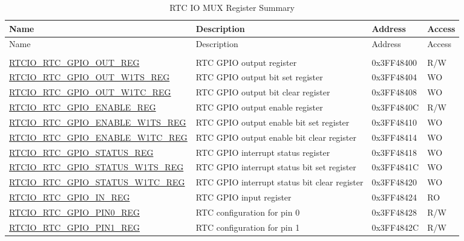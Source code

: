\begin{longtable}{ | p{6.2cm} | p{6.8cm} | p{1.9cm} | p{1.1cm} | }
\caption{RTC IO MUX Register Summary}
\\\hline\rowcolor{lightgray}
Name & Description &  Address & Access \\ \hline
\endfirsthead
\hline\rowcolor{lightgray}
Name & Description &  Address & Access \\ \hline
\endhead
\endfoot
\multicolumn{4}{|l|}{\textbf{GPIO configuration / data registers}} \\ \hline
\hyperref[regdesc:RTCIORTCGPIOOUTREG]{RTCIO\_RTC\_GPIO\_OUT\_REG} & RTC GPIO output register & 0x3FF48400 & R/W \\ \hline
\hyperref[regdesc:RTCIORTCGPIOOUTW1TSREG]{RTCIO\_RTC\_GPIO\_OUT\_W1TS\_REG} & RTC GPIO output bit set register & 0x3FF48404 & WO \\ \hline
\hyperref[regdesc:RTCIORTCGPIOOUTW1TCREG]{RTCIO\_RTC\_GPIO\_OUT\_W1TC\_REG} & RTC GPIO output bit clear register & 0x3FF48408 & WO \\ \hline
\hyperref[regdesc:RTCIORTCGPIOENABLEREG]{RTCIO\_RTC\_GPIO\_ENABLE\_REG} & RTC GPIO output enable register & 0x3FF4840C & R/W \\ \hline
\hyperref[regdesc:RTCIORTCGPIOENABLEW1TSREG]{RTCIO\_RTC\_GPIO\_ENABLE\_W1TS\_REG} & RTC GPIO output enable bit set register & 0x3FF48410 & WO \\ \hline
\hyperref[regdesc:RTCIORTCGPIOENABLEW1TCREG]{RTCIO\_RTC\_GPIO\_ENABLE\_W1TC\_REG} & RTC GPIO output enable bit clear register & 0x3FF48414 & WO \\ \hline
\hyperref[regdesc:RTCIORTCGPIOSTATUSREG]{RTCIO\_RTC\_GPIO\_STATUS\_REG} & RTC GPIO interrupt status register & 0x3FF48418 & WO \\ \hline
\hyperref[regdesc:RTCIORTCGPIOSTATUSW1TSREG]{RTCIO\_RTC\_GPIO\_STATUS\_W1TS\_REG} & RTC GPIO interrupt status bit set register & 0x3FF4841C & WO \\ \hline
\hyperref[regdesc:RTCIORTCGPIOSTATUSW1TCREG]{RTCIO\_RTC\_GPIO\_STATUS\_W1TC\_REG} & RTC GPIO interrupt status bit clear register & 0x3FF48420 & WO \\ \hline
\hyperref[regdesc:RTCIORTCGPIOINREG]{RTCIO\_RTC\_GPIO\_IN\_REG} & RTC GPIO input register & 0x3FF48424 & RO \\ \hline
\hyperref[regdesc:RTCIORTCGPIOPINnREG]{RTCIO\_RTC\_GPIO\_PIN0\_REG} & RTC configuration for pin 0 & 0x3FF48428 & R/W \\ \hline
\hyperref[regdesc:RTCIORTCGPIOPINnREG]{RTCIO\_RTC\_GPIO\_PIN1\_REG} & RTC configuration for pin 1 & 0x3FF4842C & R/W \\ \hline

\end{longtable}
